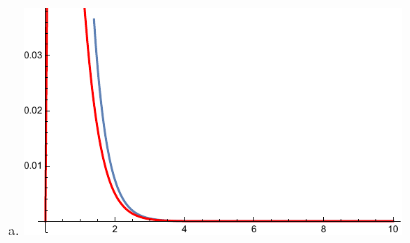 \documentclass[10pt]{mypackage}
\begin{document}
\begin{enumerate}[(a)]
\begin{center}
    \end{center}
  \item \hfill
    \begin{center}
      \includegraphics[width=10cm]{images/3_5_3e.pdf}
    \end{center}
\end{enumerate}
\end{document}
